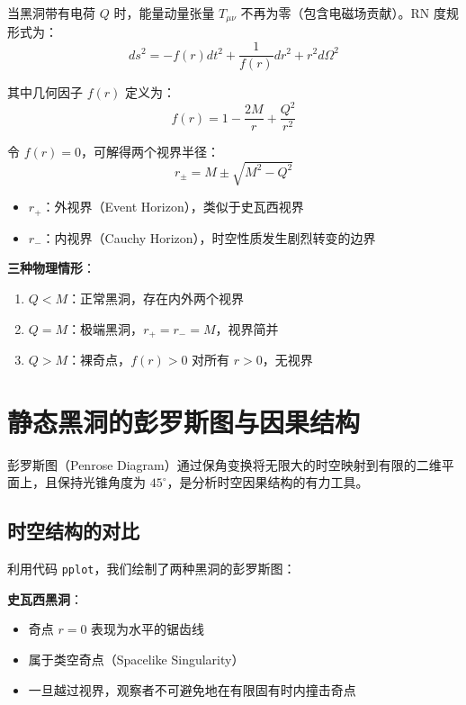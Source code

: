\documentclass[a4paper,12pt]{article}
\begin{document}
当黑洞带有电荷 $Q$ 时，能量动量张量 $T_{\mu\nu}$ 不再为零（包含电磁场贡献）。RN 度规形式为：
\begin{equation}
    ds^2 = -f(r)dt^2 + \frac{1}{f(r)}dr^2 + r^2 d\Omega^2
\end{equation}

其中几何因子 $f(r)$ 定义为：
\begin{equation}
    f(r) = 1 - \frac{2M}{r} + \frac{Q^2}{r^2}
\end{equation}

令 $f(r)=0$，可解得两个视界半径：
\begin{equation}
    r_{\pm} = M \pm \sqrt{M^2 - Q^2}
\end{equation}

\begin{itemize}
    \item $r_+$：外视界（Event Horizon），类似于史瓦西视界
    \item $r_-$：内视界（Cauchy Horizon），时空性质发生剧烈转变的边界
\end{itemize}

\textbf{三种物理情形}：
\begin{enumerate}
    \item $Q < M$：正常黑洞，存在内外两个视界
    \item $Q = M$：极端黑洞，$r_+ = r_- = M$，视界简并
    \item $Q > M$：裸奇点，$f(r) > 0$ 对所有 $r > 0$，无视界
\end{enumerate}

\section{静态黑洞的彭罗斯图与因果结构}

彭罗斯图（Penrose Diagram）通过保角变换将无限大的时空映射到有限的二维平面上，且保持光锥角度为 $45^\circ$，是分析时空因果结构的有力工具。

\subsection{时空结构的对比}

利用代码 \texttt{pplot}，我们绘制了两种黑洞的彭罗斯图：

\textbf{史瓦西黑洞}：
\begin{itemize}
    \item 奇点 $r=0$ 表现为水平的锯齿线
    \item 属于类空奇点（Spacelike Singularity）
    \item 一旦越过视界，观察者不可避免地在有限固有时内撞击奇点
\end{itemize}
\end{document}
